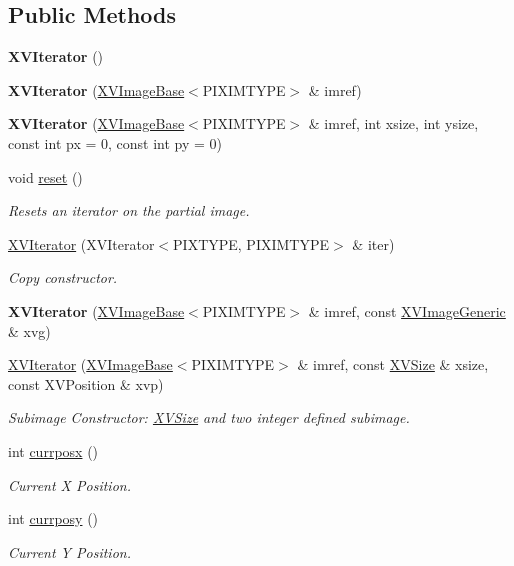 \subsection*{Public Methods}
\begin{CompactItemize}
\item 
{\bf XVIterator} ()
\item 
{\bf XVIterator} (\hyperlink{class_XVImageBase}{XVImage\-Base}$<$PIXIMTYPE$>$ \& imref)
\item 
{\bf XVIterator} (\hyperlink{class_XVImageBase}{XVImage\-Base}$<$PIXIMTYPE$>$ \& imref, int xsize, int ysize, const int px = 0, const int py = 0)
\item 
void \hyperlink{class_XVIterator_a3}{reset} ()
\begin{CompactList}\small\item\em Resets an iterator on the partial image.\item\end{CompactList}\item 
\hyperlink{class_XVIterator_a4}{XVIterator} (XVIterator$<$PIXTYPE, PIXIMTYPE$>$ \& iter)
\begin{CompactList}\small\item\em Copy constructor.\item\end{CompactList}\item 
{\bf XVIterator} (\hyperlink{class_XVImageBase}{XVImage\-Base}$<$PIXIMTYPE$>$ \& imref, const \hyperlink{class_XVImageGeneric}{XVImage\-Generic} \& xvg)
\item 
\hyperlink{class_XVIterator_a6}{XVIterator} (\hyperlink{class_XVImageBase}{XVImage\-Base}$<$PIXIMTYPE$>$ \& imref, const \hyperlink{class_XVSize}{XVSize} \& xsize, const XVPosition \& xvp)
\begin{CompactList}\small\item\em Subimage Constructor: \hyperlink{class_XVSize}{XVSize} and two integer defined subimage.\item\end{CompactList}\item 
int \hyperlink{class_XVIterator_a7}{currposx} ()
\begin{CompactList}\small\item\em Current X Position.\item\end{CompactList}\item 
int \hyperlink{class_XVIterator_a8}{currposy} ()
\begin{CompactList}\small\item\em Current Y Position.\item\end{CompactList}\item 

\end{CompactItemize}
